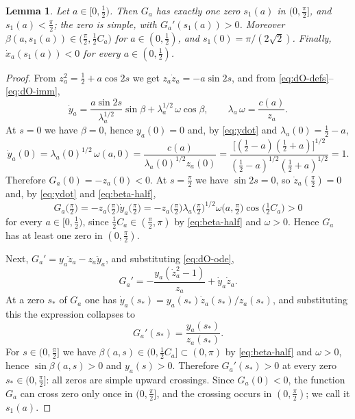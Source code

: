 \documentclass[10pt,a4paper]{amsart}
\newtheorem{lemma}[theorem]{Lemma}
\begin{document}
\begin{lemma}\label{lem:s1}
Let $a\in[0,\tfrac12)$. Then $G_a$ has exactly one zero $s_1(a)$ in $(0,\tfrac\pi2]$, and $s_1(a)<\tfrac\pi2$; the zero is simple, with $G_a'(s_1(a))>0$. Moreover $\beta(a,s_1(a))\in\bigl(\tfrac\pi2,\tfrac12C_a\bigr)$ for $a\in(0,\tfrac12)$, and $s_1(0)=\pi/(2\sqrt2)$. Finally, $\dot x_a(s_1(a))<0$ for every $a\in(0,\tfrac12)$.
\end{lemma}

\begin{proof}
From $z_a^2=\tfrac12+a\cos2s$ we get $z_a\dot z_a=-a\sin 2s$, and from \eqref{eq:dO-defs}--\eqref{eq:dO-imm},
\begin{equation}\label{eq:ydot}
\dot y_a=\frac{a\sin 2s}{\lambda_a^{1/2}}\sin\beta+\lambda_a^{1/2}\,\omega\cos\beta,\qquad \lambda_a\,\omega=\frac{c(a)}{z_a}.
\end{equation}
At $s=0$ we have $\beta=0$, hence $y_a(0)=0$ and, by \eqref{eq:ydot} and $\lambda_a(0)=\tfrac12-a$,
\[
\dot y_a(0)=\lambda_a(0)^{1/2}\,\omega(a,0)=\frac{c(a)}{\lambda_a(0)^{1/2}z_a(0)}=\frac{\bigl[(\tfrac12-a)(\tfrac12+a)\bigr]^{1/2}}{(\tfrac12-a)^{1/2}(\tfrac12+a)^{1/2}}=1 .
\]
Therefore $G_a(0)=-z_a(0)<0$. At $s=\tfrac\pi2$ we have $\sin 2s=0$, so $\dot z_a(\tfrac\pi2)=0$ and, by \eqref{eq:ydot} and \eqref{eq:beta-half},
\[
G_a\bigl(\tfrac\pi2\bigr)=-z_a\bigl(\tfrac\pi2\bigr)\dot y_a\bigl(\tfrac\pi2\bigr)=-z_a\bigl(\tfrac\pi2\bigr)\lambda_a\bigl(\tfrac\pi2\bigr)^{1/2}\omega\bigl(a,\tfrac\pi2\bigr)\cos\bigl(\tfrac12C_a\bigr)>0
\]
for every $a\in[0,\tfrac12)$, since $\tfrac12C_a\in(\tfrac\pi2,\pi)$ by \eqref{eq:beta-half} and $\omega>0$. Hence $G_a$ has at least one zero in $(0,\tfrac\pi2)$.

Next, $G_a'=y_a\ddot z_a-z_a\ddot y_a$, and substituting \eqref{eq:dO-ode},
\[
G_a'=-\frac{y_a(\dot z_a^2-1)}{z_a}+\dot y_a\dot z_a .
\]
At a zero $s_*$ of $G_a$ one has $\dot y_a(s_*)=y_a(s_*)\dot z_a(s_*)/z_a(s_*)$, and substituting this the expression collapses to
\begin{equation}\label{eq:Gprime}
G_a'(s_*)=\frac{y_a(s_*)}{z_a(s_*)} .
\end{equation}
For $s\in(0,\tfrac\pi2]$ we have $\beta(a,s)\in(0,\tfrac12C_a]\subset(0,\pi)$ by \eqref{eq:beta-half} and $\omega>0$, hence $\sin\beta(a,s)>0$ and $y_a(s)>0$. Therefore $G_a'(s_*)>0$ at every zero $s_*\in(0,\tfrac\pi2]$: all zeros are simple upward crossings. Since $G_a(0)<0$, the function $G_a$ can cross zero only once in $(0,\tfrac\pi2]$, and the crossing occurs in $(0,\tfrac\pi2)$; we call it $s_1(a)$.


\end{proof}
\end{document}
